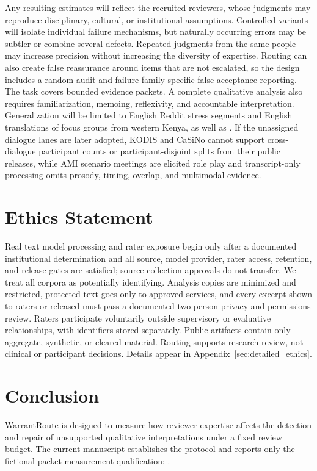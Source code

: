 Any resulting estimates will reflect the recruited reviewers, whose judgments may reproduce disciplinary, cultural, or institutional assumptions. Controlled variants will isolate individual failure mechanisms, but naturally occurring errors may be subtler or combine several defects. Repeated judgments from the same people may increase precision without increasing the diversity of expertise. Routing can also create false reassurance around items that are not escalated, so the design includes a random audit and failure-family-specific false-acceptance reporting. The task covers bounded evidence packets. A complete qualitative analysis also requires familiarization, memoing, reflexivity, and accountable interpretation. Generalization will be limited to English Reddit stress segments and English translations of focus groups from western Kenya, as well as . If the unassigned dialogue lanes are later adopted, KODIS and CaSiNo cannot support cross-dialogue participant counts or participant-disjoint splits from their public releases, while AMI scenario meetings are elicited role play and transcript-only processing omits prosody, timing, overlap, and multimodal evidence.

\section{Ethics Statement}

Real text model processing and rater exposure begin only after a documented
institutional determination and all source, model provider, rater access,
retention, and release gates are satisfied; source collection approvals do not
transfer. We treat all corpora as potentially identifying. Analysis copies are
minimized and restricted, protected text goes only to approved services, and
every excerpt shown to raters or released must pass a documented two-person
privacy and permissions review. Raters
participate voluntarily outside supervisory or evaluative relationships, with
identifiers stored separately. Public artifacts contain only aggregate,
synthetic, or cleared material. Routing supports research review, not clinical
or participant decisions. Details appear in Appendix~\ref{sec:detailed_ethics}.

\section{Conclusion}

WarrantRoute is designed to measure how reviewer expertise affects the detection and repair of unsupported qualitative interpretations under a fixed review budget. The current manuscript establishes the protocol and reports only the fictional-packet measurement qualification; .
